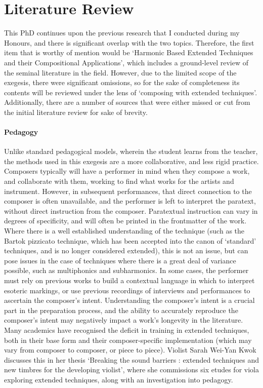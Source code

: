 \section{Literature Review}
This PhD continues upon the previous research that I conducted during my Honours, and there is significant overlap with the two topics.
Therefore, the first item that is worthy of mention would be `Harmonic Based Extended Techniques and their Compositional Applications', which includes a ground-level review of the seminal literature in the field.\autocite{grayHarmonicBasedExtended2019}
However, due to the limited scope of the exegesis, there were significant omissions, so for the sake of completeness its contents will be reviewed under the lens of `composing with extended techniques'.
Additionally, there are a number of sources that were either missed or cut from the initial literature review for sake of brevity.


\paragraph{Pedagogy}
Unlike standard pedagogical models, wherein the student learns from the teacher, the methods used in this exegesis are a more collaborative, and less rigid practice.
Composers typically will have a performer in mind when they compose a work, and collaborate with them, working to find what works for the artists and instrument.
However, in subsequent performances, that direct connection to the composer is often unavailable, and the performer is left to interpret the paratext, without direct instruction from the composer.
Paratextual instruction can vary in degrees of specificity, and will often be printed in the frontmatter of the work.
Where there is a well established understanding of the technique (such as the Bartok pizzicato technique, which has been accepted into the canon of `standard' techniques, and is no longer considered extended), this is not an issue, but can pose issues in the case of techniques where there is a great deal of variance possible, such as multiphonics and subharmonics.
In some cases, the performer must rely on previous works to build a contextual language in which to interpret esoteric markings, or use previous recordings of interviews and performances to ascertain the composer's intent.
Understanding the composer's intent is a crucial part in the preparation process, and the ability to accurately reproduce the composer's intent may negatively impact a work's longevity in the literature.
Many academics have recognised the deficit in training in extended techniques, both in their base form and their composer-specific implementation (which may vary from composer to composer, or piece to piece). 
Violist Sarah Wei-Yan Kwok discusses this in her thesis `Breaking the sound barriers : extended techniques and new timbres for the developing violist', where she commissions six etudes for viola exploring extended techniques, along with an investigation into pedagogy.\autocite{kwokBreakingSoundBarriers2018}

